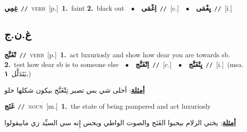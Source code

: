 \documentclass[10pt,a4paper,twoside]{article} %
\begin{document}
\begin{multicols}{2}
{\setlength\topsep{0pt}\textbf{\foreignlanguage{arabic}{غِمِي}}\ {\color{gray}\texttt{//}\color{black}}\ \textsc{verb}\ [p.]\ \textbf{1.}~faint  \textbf{2.}~black out\ \ $\bullet$\ \ \setlength\topsep{0pt}\textbf{\foreignlanguage{arabic}{اِغْمَى}}\ {\color{gray}\texttt{//}\color{black}}\ [c.]\ \ $\bullet$\ \ \setlength\topsep{0pt}\textbf{\foreignlanguage{arabic}{يِغْمَى}}\ {\color{gray}\texttt{//}\color{black}}\ [i.]\ } \vspace{2mm}

\vspace{-3mm}
\subsection*{\color{blue}\foreignlanguage{arabic}{غ.ن.ج}\color{blue}{}} 

{\setlength\topsep{0pt}\textbf{\foreignlanguage{arabic}{تْغَنَّج}}\ {\color{gray}\texttt{//}\color{black}}\ \textsc{verb}\ [p.]\ \textbf{1.}~act luxuriosly and show how dear you are towards sb.  \textbf{2.}~test how dear sb is to someone else\ \ $\bullet$\ \ \setlength\topsep{0pt}\textbf{\foreignlanguage{arabic}{اِتْغَنَّج}}\ {\color{gray}\texttt{//}\color{black}}\ [c.]\ \ $\bullet$\ \ \setlength\topsep{0pt}\textbf{\foreignlanguage{arabic}{يِتْغَنَّج}}\ {\color{gray}\texttt{//}\color{black}}\ [i.]\ \color{gray}(msa. \foreignlanguage{arabic}{يَتَدَلَّل}~\foreignlanguage{arabic}{\textbf{١.}})\color{black}\  \begin{flushright}\color{gray}\foreignlanguage{arabic}{\textbf{\underline{\foreignlanguage{arabic}{أمثلة}}}: أحلى شي بس تصير تِتْغَنَّج بيكون شكلها حلو}\end{flushright}\color{black}} \vspace{2mm}

{\setlength\topsep{0pt}\textbf{\foreignlanguage{arabic}{غَنَج}}\ {\color{gray}\texttt{//}\color{black}}\ \textsc{noun}\ [m.]\ \textbf{1.}~the state of being pampered and act luxuriosly\  \begin{flushright}\color{gray}\foreignlanguage{arabic}{\textbf{\underline{\foreignlanguage{arabic}{أمثلة}}}: يختي الزلام بيحبوا الغَنَج والصوت الواطي ويحس إِنه سي السيِّد زي مابيقولوا}\end{flushright}\color{black}} \vspace{2mm}


\end{multicols}
\end{document}
